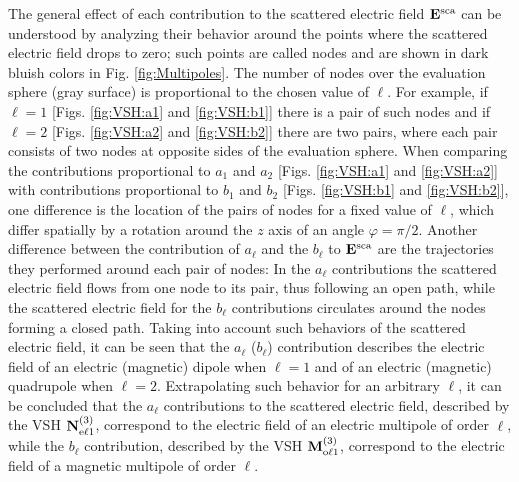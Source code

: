 The general effect of each contribution to the scattered electric field  $\vb{E}^\text{sca}$  can be understood by analyzing their behavior around the points where the scattered electric field drops to  zero; such points are called nodes and are shown in dark bluish colors in  Fig. \ref{fig:Multipoles}. The number of nodes over the evaluation sphere (gray surface) is proportional to the chosen value of $\ell$. For example, if $\ell = 1$ [Figs. \ref{fig:VSH:a1} and \ref{fig:VSH:b1}] there is a pair of such nodes and if $\ell = 2$ [Figs. \ref{fig:VSH:a2} and \ref{fig:VSH:b2}] there are two pairs, where each pair consists of two nodes at opposite sides of the evaluation sphere. When comparing the contributions proportional to $a_1$ and $a_2$ [Figs. \ref{fig:VSH:a1} and \ref{fig:VSH:a2}] with contributions proportional to $b_1$ and $b_2$ [Figs. \ref{fig:VSH:b1} and \ref{fig:VSH:b2}], one difference is the location of the pairs of nodes for a fixed value of $\ell$, which differ spatially by a rotation around the $z$ axis of an angle $\varphi = \pi/2$.  Another difference between the contribution of $a_\ell$ and the $b_\ell$ to  $\vb{E}^\text{sca}$ are the trajectories they performed around each pair of nodes: In the $a_\ell$ contributions the scattered electric field flows from one node to its pair, thus following an open path, while the scattered electric field for the $b_\ell$ contributions circulates around the nodes forming a closed path. Taking into account such behaviors of the scattered electric field, it can be seen that the $a_\ell$ ($b_\ell$) contribution describes the electric field of an electric (magnetic) dipole when $\ell = 1$ and of an electric (magnetic) quadrupole when $\ell = 2$. Extrapolating such behavior for an arbitrary $\ell$,  it can be concluded that the $a_\ell$ contributions to the scattered electric field, described by the VSH $\vb{N}^{(3)}_{\text{e}\ell 1}$, correspond to the electric field of an electric multipole of order $\ell$, while the $b_\ell$ contribution, described by the VSH $\vb{M}^{(3)}_{\text{o}\ell 1}$, correspond to the electric field of a magnetic multipole of order $\ell$.

